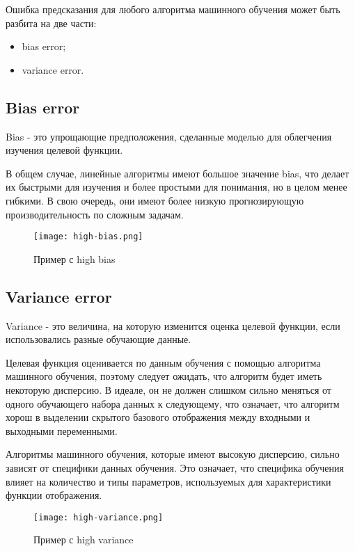 Ошибка предсказания для любого алгоритма машинного обучения может быть разбита на две части:

\begin{itemize}
	\item bias error;
	\item variance error.
\end{itemize}

\subsection{Bias error}

Bias - это упрощающие предположения, сделанные моделью для облегчения изучения целевой функции.

В общем случае, линейные алгоритмы имеют большое значение bias, что делает их быстрыми для изучения и более простыми для понимания, но в целом менее гибкими. В свою очередь, они имеют более низкую прогнозирующую производительность по сложным задачам.

\begin{figure}[h]
\centering
	\texttt{[image: high-bias.png]}
	\caption{Пример с high bias}
	\label{sec:purpose:payings}
\end{figure}

\subsection{Variance error}

Variance - это величина, на которую изменится оценка целевой функции, если использовались разные обучающие данные.

Целевая функция оценивается по данным обучения с помощью алгоритма машинного обучения, поэтому следует ожидать, что алгоритм будет иметь некоторую дисперсию. В идеале, он не должен слишком сильно меняться от одного обучающего набора данных к следующему, что означает, что алгоритм хорош в выделении скрытого базового отображения между входными и выходными переменными.

Алгоритмы машинного обучения, которые имеют высокую дисперсию, сильно зависят от специфики данных обучения. Это означает, что специфика обучения влияет на количество и типы параметров, используемых для характеристики функции отображения. \cite{bv}

\begin{figure}[h]
\centering
	\texttt{[image: high-variance.png]}
	\caption{Пример с high variance}
	\label{sec:purpose:payings}
\end{figure}

